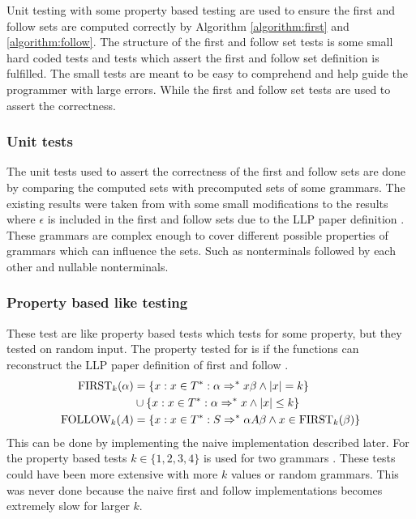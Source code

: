 Unit testing with some property based testing are used to ensure the first and follow sets are computed correctly by Algorithm \ref{algorithm:first} and \ref{algorithm:follow}. The structure of the first and follow set tests is some small hard coded tests and tests which assert the first and follow set definition is fulfilled. The small tests are meant to be easy to comprehend and help guide the programmer with large errors. While the first and follow set tests are used to assert the correctness.

\subsubsection{Unit tests}
The unit tests used to assert the correctness of the first and follow sets are done by comparing the computed sets with precomputed sets of some grammars. The existing results were taken from \cite[58, 62, 63, 65]{Mogensen} with some small modifications to the results where $\epsilon$ is included in the first and follow sets due to the LLP paper definition \cite[5]{Vagner2007}. These grammars are complex enough to cover different possible properties of grammars which can influence the sets. Such as nonterminals followed by each other and nullable nonterminals.

\subsubsection{Property based like testing}
These test are like property based tests which tests for some property, but they tested on random input. The property tested for is if the functions can reconstruct the LLP paper definition of first and follow \cite[5]{Vagner2007}.
\begin{align*}
    \text{FIRST}_k(\alpha) &= \{x : x \in T^* : \alpha \Rightarrow^* x \beta \land |x| = k\} \\ 
    \, &\cup \{x : x \in T^* : \alpha \Rightarrow^* x \land |x| \leq k\} \\
    \text{FOLLOW}_k(A) &= \{x : x \in T^* : S \Rightarrow^* \alpha A \beta \land x \in \text{FIRST}_k(\beta)\}
\end{align*}
This can be done by implementing the naive implementation described later. For the property based tests $k \in \{1, 2, 3, 4\}$ is used for two grammars \cite[62, 63]{Mogensen}. These tests could have been more extensive with more $k$ values or random grammars. This was never done because the naive first and follow implementations becomes extremely slow for larger $k$.

